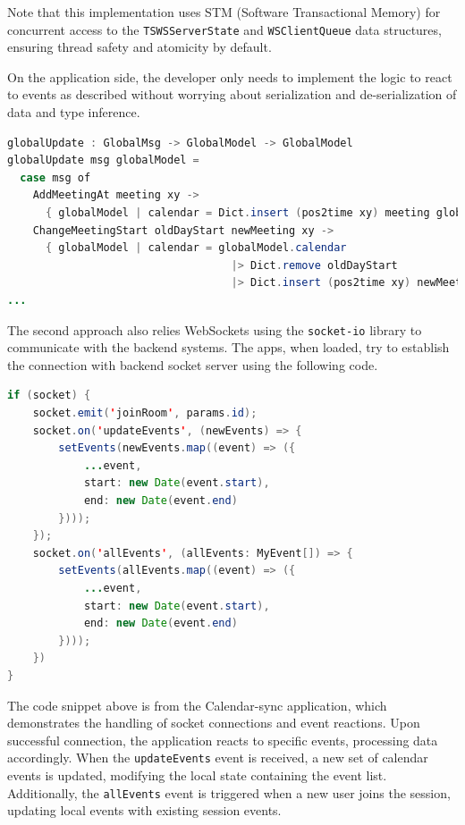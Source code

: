 Note that this implementation uses STM (Software Transactional Memory) for concurrent access to the \lstinline{TSWSServerState} and \lstinline{WSClientQueue} data structures, ensuring thread safety and atomicity by default.

On the application side, the developer only needs to implement the logic to react to events as described without worrying about serialization and de-serialization of data and type inference.

\begin{lstlisting}[language=Java, caption=Global State Update, label=lst:java, mathescape=true]
globalUpdate : GlobalMsg -> GlobalModel -> GlobalModel
globalUpdate msg globalModel =
  case msg of
    AddMeetingAt meeting xy -> 
      { globalModel | calendar = Dict.insert (pos2time xy) meeting globalModel.calendar}
    ChangeMeetingStart oldDayStart newMeeting xy ->
      { globalModel | calendar = globalModel.calendar
                                   |> Dict.remove oldDayStart
                                   |> Dict.insert (pos2time xy) newMeeting
...
\end{lstlisting}

The second approach also relies WebSockets using the \lstinline{socket-io} library to communicate with the backend systems. The apps, when loaded, try to establish the connection with backend socket server using the following code.

\begin{lstlisting}[language=Java, caption=New Connection Initialization, label=lst:java, mathescape=true]
if (socket) {
    socket.emit('joinRoom', params.id);
    socket.on('updateEvents', (newEvents) => {
        setEvents(newEvents.map((event) => ({
            ...event,
            start: new Date(event.start),
            end: new Date(event.end)
        })));
    });
    socket.on('allEvents', (allEvents: MyEvent[]) => {
        setEvents(allEvents.map((event) => ({
            ...event,
            start: new Date(event.start),
            end: new Date(event.end)
        })));
    })
}
\end{lstlisting}

The code snippet above is from the Calendar-sync application, which demonstrates the handling of socket connections and event reactions. Upon successful connection, the application reacts to specific events, processing data accordingly. When the \lstinline{updateEvents} event is received, a new set of calendar events is updated, modifying the local state containing the event list. Additionally, the \lstinline{allEvents} event is triggered when a new user joins the session, updating local events with existing session events.

